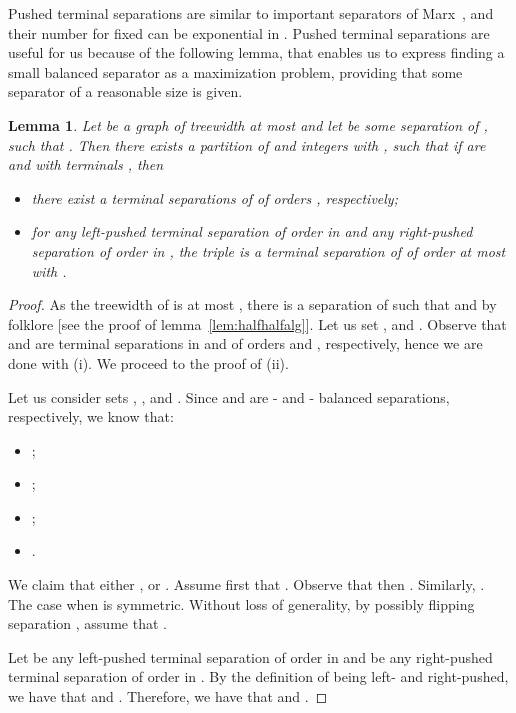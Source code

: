 \documentclass[a4paper,11pt]{article}
\newtheorem{lemma}{Lemma}[section]
\theoremstyle{definition}
\theoremstyle{remark}
\begin{document}
Pushed terminal separations are similar to important separators of
Marx~\cite{Marx06}, and their number for fixed  can be
exponential in .  Pushed terminal separations are useful for us
because of the following lemma, that enables us to express finding a
small balanced separator as a maximization problem, providing that
some separator of a reasonable size is given.

\begin{lemma}\label{lem:c4vc}
  Let  be a graph of treewidth at most  and let  be
  some separation of , such that
  .  Then there exists a partition
   of  and integers  with
  , such that if  are  and  with terminals
  , then
  \begin{itemize}
  \item[(i)] there exist a terminal separations of  of orders
    , respectively;
  \item[(ii)] for any left-pushed terminal separation 
    of order  in  and any right-pushed separation
     of order  in , the triple  is a
    terminal separation of  of order at most  with .
  \end{itemize}
\end{lemma}
\begin{proof}
  As the treewidth of  is at most , there is a separation
   of  such that  and  
  by folklore [see the proof of lemma~\ref{lem:halfhalfalg}].  Let us set 
  ,
   and .  Observe that 
  and  are terminal separations in  and  of
  orders  and , respectively, hence we are done with (i).
  We proceed to the proof of (ii).
  
  Let us consider sets , ,  and .
  Since  and  are - and
  - balanced separations, respectively, we know that:
  \begin{itemize}
  \item ;
  \item ;
  \item ;
  \item .
  \end{itemize}
  We claim that either , or .  Assume first that .  Observe that then .  Similarly, .  The case when  is symmetric.  Without loss
  of generality, by possibly flipping separation , assume
  that .
  
  Let  be any left-pushed terminal separation of order
   in  and  be any right-pushed terminal
  separation of order  in .  By the definition of being
  left- and right-pushed, we have that  and .  Therefore, we
  have that  and .
\end{proof}
\end{document}
